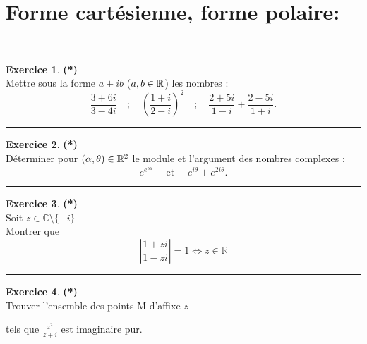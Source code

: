 \documentclass[a4paper,11pt]{article}
\theoremstyle{definition}
\newtheorem{exo}{Exercice} %
\begin{document}
 	
	

\noindent{}
\medskip




\section*{Forme cartésienne, forme polaire:}\hfill\\%
\begin{minipage}{1\linewidth}
	\begin{minipage}[t]{0.48\linewidth}
		\raggedright
	
\begin{exo}\textbf{(*)}\quad\\[0.2cm]
	  Mettre sous la forme $a+ib$ ($a,b \in \mathbb{R}$) les nombres :
	 $$ \frac{3+6i}{3-4i}  \quad ; \quad \left(\frac{1+i}{2-i}\right)^2 \quad;  \quad
	 \frac{2+5i}{1-i} + \frac{2-5i}{1+i}. $$
	 
	\centering
	\rule{1\linewidth}{0.6pt}
\end{exo}



\begin{exo}\textbf{(*)}\quad\\[0.2cm]
 	 D\'eterminer pour $(\alpha, \theta) \in \mathbb{R}^2$ le module et l'argument des nombres
 	complexes  :
 	$$e^{e^{i\alpha}} \quad \text{ et } \quad e^{i\theta}+e^{2i\theta}.$$
 	
 	
	\centering
	\rule{1\linewidth}{0.6pt}
\end{exo}

\begin{exo}\textbf{(*)}\quad\\[0.2cm]
 
Soit $z \in \mathbb{C} \setminus \{-i\}$ \\
Montrer que 
$$ \left| \dfrac{1+zi}{1-zi} \right| = 1 \iff z \in \mathbb{R} $$


\centering
\rule{1\linewidth}{0.6pt}
\end{exo}

\begin{exo}\textbf{(*)}\quad\\[0.2cm]
	Trouver l'ensemble des points $\mathrm{M}$ d'affixe $z$ 
	
	tels que $\frac{z^2}{z+ i}$ est imaginaire pur.
	

\end{exo}
\end{minipage}
\end{minipage}
\end{document}
